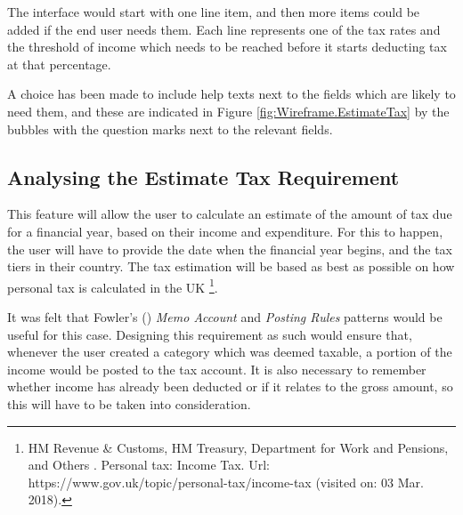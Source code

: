 The interface would start with one line item, and then more items could be
added if the end user needs them. Each line represents one of the tax rates and
the threshold of income which needs to be reached before it starts deducting
tax at that percentage.

A choice has been made to include help texts next to the fields which are
likely to need them, and these are indicated in Figure
\ref{fig:Wireframe.EstimateTax} by the bubbles with the question marks next to
the relevant fields.



\subsection{Analysing the Estimate Tax Requirement}

This feature will allow the user to calculate an estimate of the amount of tax
due for a financial year, based on their income and expenditure. For this to
happen, the user will have to provide the date when the financial year begins,
and the tax tiers in their country. The tax estimation will be based as best as
possible on how personal tax is calculated in the UK \footnote{HM Revenue \& Customs, HM Treasury, Department for Work and Pensions, and Others . Personal tax: Income Tax. Url: https://www.gov.uk/topic/personal-tax/income-tax (visited on: 03 Mar. 2018).}. 

It was felt that Fowler's (\citeyear[][Session.~6.4-6.5]{fowler1997analysis})
\emph{Memo Account} and \emph{Posting Rules} patterns would be useful for this
case. Designing this requirement as such would ensure that, whenever the user
created a category which was deemed taxable, a portion of the income would be
posted to the tax account. It is also necessary to remember whether income has
already been deducted or if it relates to the gross amount, so this will have
to be taken into consideration. 


